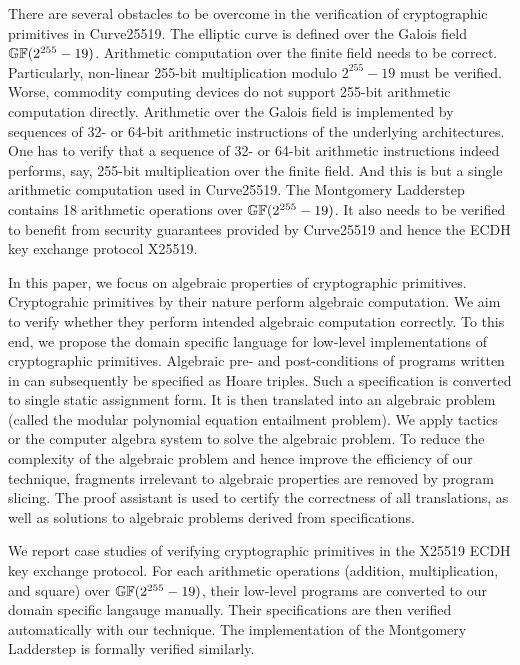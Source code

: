 There are several obstacles to be overcome in the verification of
cryptographic primitives in Curve25519. The elliptic curve is defined
over the Galois field $\mathbb{GF}(2^{255} - 19)$. Arithmetic computation
over the finite field needs to be correct. Particularly, non-linear
255-bit multiplication modulo $2^{255} - 19$ must be verified. Worse,
commodity computing devices do not support 255-bit arithmetic
computation directly. Arithmetic over the Galois field is implemented
by sequences of 32- or 64-bit arithmetic instructions of the underlying
architectures. One has to verify that a sequence of 32- or 64-bit
arithmetic instructions indeed performs, say, 255-bit multiplication
over the finite field. And this is but a single arithmetic computation
used in Curve25519. The Montgomery Ladderstep contains 18 arithmetic
operations over $\mathbb{GF}(2^{255} - 19)$. It also needs to be verified
to benefit from security guarantees provided by Curve25519 and hence
the ECDH key exchange protocol X25519.

In this paper, we focus on algebraic properties of cryptographic
primitives. Cryptograhic primitives by their nature perform algebraic
computation. We aim to verify whether they perform intended algebraic
computation correctly. To this end, we propose the domain specific
language \mydsl for low-level implementations of cryptographic
primitives. Algebraic pre- and post-conditions of programs written in
\mydsl can subsequently be specified as Hoare triples. Such a
specification is converted to single static assignment form. It is
then translated into an algebraic problem (called the modular
polynomial equation entailment problem). We apply \coq tactics or the
computer algebra system \singular to solve the algebraic problem. To
reduce the complexity of the algebraic problem and hence improve the
efficiency of our technique, fragments irrelevant to algebraic
properties are removed by program slicing. The \coq proof assistant is
used to certify the correctness of all translations, as well as
solutions to algebraic problems derived from specifications.

We report case studies of verifying cryptographic primitives in the
X25519 ECDH key exchange protocol. For each arithmetic operations
(addition, multiplication, and square) over $\mathbb{GF}(2^{255} - 19)$,
their low-level \qhasm programs are converted to our domain specific 
langauge \mydsl manually. Their specifications are then verified
automatically with our technique. The \qhasm implementation
of the Montgomery Ladderstep is formally verified similarly. 




